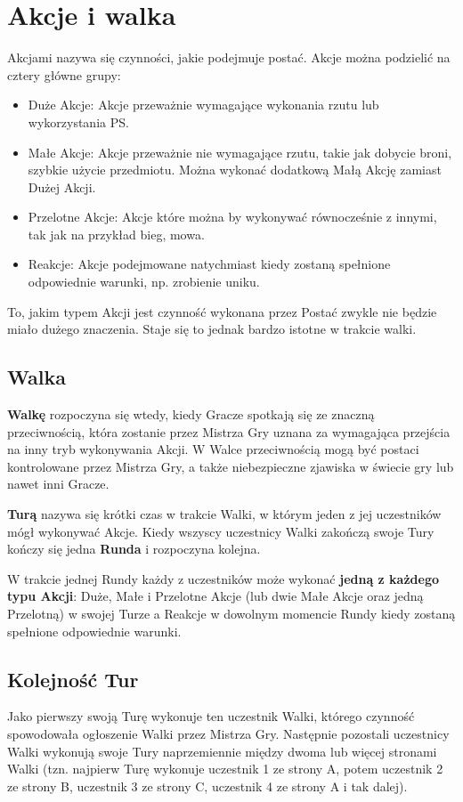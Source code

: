 \documentclass[10pt,a4paper]{book}
\begin{document}
\section{Akcje i walka}
\begin{multicols}{2}

Akcjami nazywa się czynności, jakie podejmuje postać. Akcje można podzielić na cztery główne grupy:
\begin{itemize}
	\item Duże Akcje: Akcje przeważnie wymagające wykonania rzutu lub wykorzystania PS.
	\item Małe Akcje: Akcje przeważnie nie wymagające rzutu, takie jak dobycie broni, szybkie użycie przedmiotu. Można wykonać dodatkową Małą Akcję zamiast Dużej Akcji.
	\item Przelotne Akcje: Akcje które można by wykonywać równocześnie z innymi, tak jak na przykład bieg, mowa.
	\item Reakcje: Akcje podejmowane natychmiast kiedy zostaną spełnione odpowiednie warunki, np. zrobienie uniku.
\end{itemize}

To, jakim typem Akcji jest czynność wykonana przez Postać zwykle nie będzie miało dużego znaczenia. Staje się to jednak bardzo istotne w trakcie walki.


\subsection*{Walka}
\textbf{Walkę} rozpoczyna się wtedy, kiedy Gracze spotkają się ze znaczną przeciwnością, która zostanie przez Mistrza Gry uznana za wymagająca przejścia na inny tryb wykonywania Akcji. W Walce przeciwnością mogą być postaci kontrolowane przez Mistrza Gry, a także niebezpieczne zjawiska w świecie gry lub nawet inni Gracze.

\textbf{Turą} nazywa się krótki czas w trakcie Walki, w którym jeden z jej uczestników mógł wykonywać Akcje. Kiedy wszyscy uczestnicy Walki zakończą swoje Tury kończy się jedna \textbf{Runda} i rozpoczyna kolejna.

W trakcie jednej Rundy każdy z uczestników może wykonać \textbf{jedną z każdego typu Akcji}: Duże, Małe i Przelotne Akcje (lub dwie Małe Akcje oraz jedną Przelotną) w swojej Turze a Reakcje w dowolnym momencie Rundy kiedy zostaną spełnione odpowiednie warunki.


\subsection*{Kolejność Tur}
Jako pierwszy swoją Turę wykonuje ten uczestnik Walki, którego czynność spowodowała ogłoszenie Walki przez Mistrza Gry. Następnie pozostali uczestnicy Walki wykonują swoje Tury naprzemiennie między dwoma lub więcej stronami Walki (tzn. najpierw Turę wykonuje uczestnik 1 ze strony A, potem uczestnik 2 ze strony B, uczestnik 3 ze strony C, uczestnik 4 ze strony A i tak dalej).



\end{multicols}
\end{document}

